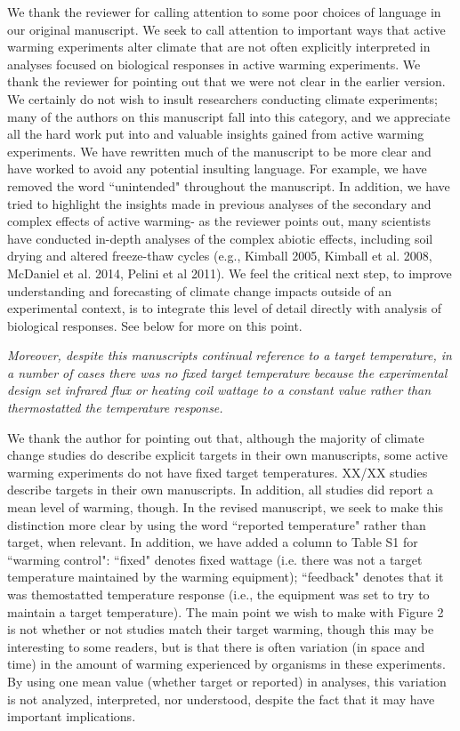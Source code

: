\documentclass[11pt,a4paper]{letter}
\begin{document}
\begin{letter}{}
We thank the reviewer for calling attention to some poor choices of language in our original manuscript. We seek to call attention to important ways that active warming experiments alter climate that are not often explicitly interpreted in analyses focused on biological responses in active warming experiments. We thank the reviewer for pointing out that we were not clear in the earlier version. We certainly do not wish to insult researchers conducting climate experiments; many of the authors on this manuscript fall into this category, and we appreciate all the hard work put into and valuable insights gained from active warming experiments. We have rewritten much of the manuscript to be more clear and have worked to avoid any potential insulting language. For example, we have removed the word ``unintended" throughout the manuscript. In addition, we have tried to highlight the insights made in previous analyses of the secondary and complex effects of active warming- as the reviewer points out, many scientists have conducted in-depth analyses of the complex abiotic effects, including soil drying and altered freeze-thaw cycles (e.g., Kimball 2005, Kimball et al. 2008, McDaniel et al. 2014, Pelini et al 2011). We feel the critical next step, to improve understanding and  forecasting of climate change impacts outside of an experimental context, is to integrate this level of detail directly with analysis of biological responses. See below for more on this point. 

\par \emph{Moreover, despite this manuscripts continual reference to a target temperature, in a number of cases there  was no fixed target temperature because the experimental design set infrared flux or heating coil wattage to a constant value rather than thermostatted the temperature response.}
\par We thank the author for pointing out that, although the majority of climate change studies do describe explicit targets in their own manuscripts, some active warming experiments do not have fixed target temperatures. XX/XX studies describe targets in their own manuscripts. In addition, all studies did report a mean level of warming, though. In the revised manuscript, we seek to make this distinction  more clear by  using the word ``reported temperature" rather than target, when relevant. In addition, we have added a column to Table S1 for ``warming control": ``fixed" denotes fixed wattage (i.e. there was not a target temperature maintained by the warming equipment); ``feedback" denotes that it was themostatted temperature response (i.e., the equipment was set to try to maintain a target temperature). The main point we wish to make with Figure 2 is not whether or not studies match their target warming, though this may be interesting to some readers, but is that there is often variation (in space and time) in the amount of warming experienced by organisms in these experiments. By using one mean value (whether target or reported) in analyses, this variation is not analyzed, interpreted, nor understood, despite the fact that it may have important implications.


\end{letter}
\end{document}
